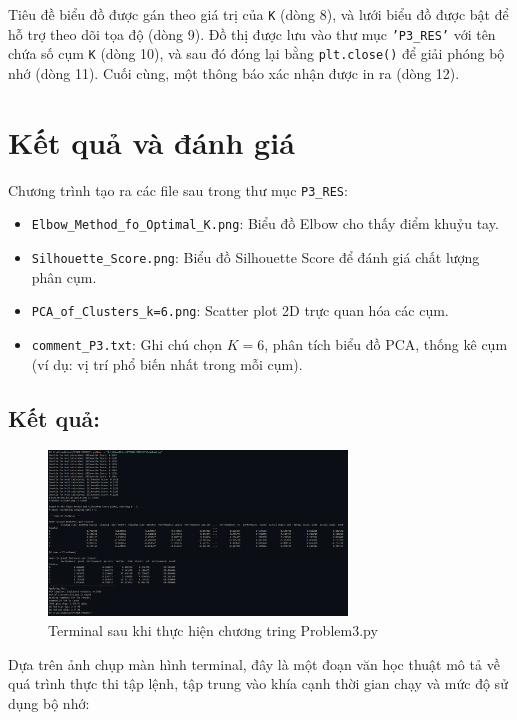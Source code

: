 \documentclass[12pt]{report}
\begin{document}
{Tiêu đề biểu đồ được gán theo giá trị của \texttt{K} (dòng 8), và lưới biểu đồ được bật để hỗ trợ theo dõi tọa độ (dòng 9). Đồ thị được lưu vào thư mục \texttt{'P3\_RES'} với tên chứa số cụm \texttt{K} (dòng 10), và sau đó đóng lại bằng \texttt{plt.close()} để giải phóng bộ nhớ (dòng 11). Cuối cùng, một thông báo xác nhận được in ra (dòng 12).
\section{Kết quả và đánh giá}
Chương trình tạo ra các file sau trong thư mục \texttt{P3\_RES}:
\begin{itemize}
  \item \texttt{Elbow\_Method\_fo\_Optimal\_K.png}: Biểu đồ Elbow cho thấy điểm khuỷu tay.
  \item \texttt{Silhouette\_Score.png}: Biểu đồ Silhouette Score để đánh giá chất lượng phân cụm.
  \item \texttt{PCA\_of\_Clusters\_k=6.png}: Scatter plot 2D trực quan hóa các cụm.
  \item \texttt{comment\_P3.txt}: Ghi chú chọn $K=6$, phân tích biểu đồ PCA, thống kê cụm (ví dụ: vị trí phổ biến nhất trong mỗi cụm).
\end{itemize}
\subsection{Kết quả:}
\begin{figure}[h]
    \centering
    \includegraphics[width=300px]{Terminal_3.png}
    \caption{Terminal sau khi thực hiện chương tring Problem3.py}
    \label{fig:term3}
\end{figure}
Dựa trên ảnh chụp màn hình terminal, đây là một đoạn văn học thuật mô tả về quá trình thực thi tập lệnh, tập trung vào khía cạnh thời gian chạy và mức độ sử dụng bộ nhớ:

}
\end{document}
